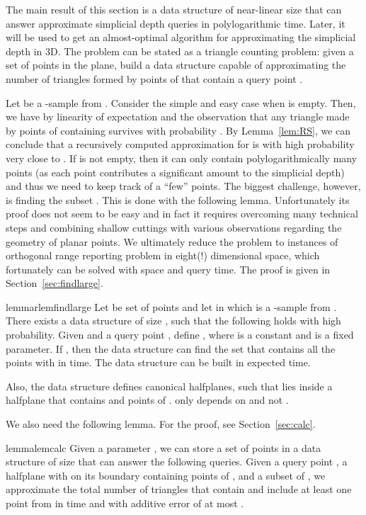 The main result of this section is a data structure of near-linear size that can 
answer approximate simplicial depth queries in polylogarithmic time.
Later, it will be used to get an almost-optimal algorithm for approximating the
simplicial depth in 3D.
The problem can be stated as a triangle counting problem:
given a set of  points  in the plane, build a data structure 
capable of approximating
the number of triangles formed by points of  that contain a query point .

Let  be a -sample from .
Consider the simple and easy case when  is empty. Then, we have
 by linearity of expectation and the observation
that any triangle made by points of  containing 
survives with probability . By Lemma~\ref{lem:RS}, we can conclude that
a recursively computed approximation for  is with high probability
very close to .
If  is not empty, then it can only contain polylogarithmically many points
(as each point contributes a significant amount to the simplicial depth) and thus
we need to keep track of a ``few'' points.
The biggest challenge, however, is finding the subset .
This is done with the following lemma.
    Unfortunately its proof does not seem to be easy and in fact it requires overcoming
    many technical steps and combining shallow cuttings with various observations
    regarding the geometry of planar points. We ultimately reduce the problem
    to instances of orthogonal range reporting problem in eight(!) dimensional space, which fortunately can
    be solved with  space and  query time.
    The proof is given in Section~\ref{sec:findlarge}.

\begin{restatable}{lemma}{rlemfindlarge}
    \label{lem:findlarge}
	Let   be set of  points and let 
     in which
     is a -sample from .
    There exists a data structure of size , such that the following holds with high probability.
    Given  and a query point , define , where
     is a constant and  is a fixed parameter.
    If , then
    the data structure can find the set  that contains all
    the points  with  in  time.
	The data structure can be built in  expected time. 

    Also, the data structure defines  canonical halfplanes, such that 
     lies inside a halfplane  that contains  and  points of .
     only depends on  and not .
\end{restatable}


We also need the following lemma.
For the proof, see Section~\ref{sec:calc}.
\begin{restatable}{lemma}{lemcalc}\label{lem:calc}
    Given a parameter , 
    we can store a set  of  points in a data structure of size  
    that can answer the following queries. 
	Given a query point , a halfplane  
	with  on its boundary containing
     points of , and a subset of , we
    approximate the total number of triangles that contain  and include at least one point 
    from  in  time and with additive error of 
	at most .
\end{restatable}

